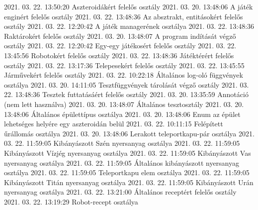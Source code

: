  {2021. 03. 22. 13:50:20} {Aszteroidákért felelős osztály}
 {2021. 03. 20. 13:48:06} {A játék enginért felelős osztály}
 {2021. 03. 22. 13:48:36} {Az absztrakt, entitásokért felelős osztály}
 {2021. 03. 22. 12:20:42} {A játék managerének osztálya}
 {2021. 03. 22. 13:48:36} {Raktárokért felelős osztály}
 {2021. 03. 20. 13:48:07} {A program indítását végző osztály}
 {2021. 03. 22. 12:20:42} {Egy-egy játékosért felelős osztály}
 {2021. 03. 22. 13:45:56} {Robotokért felelős osztály}
 {2021. 03. 22. 13:48:36} {Játéktérért felelős osztály}
 {2021. 03. 22. 13:17:36} {Telepesekért felelős osztály}
 {2021. 03. 22. 13:45:55} {Járművekért felelős osztály}
 {2021. 03. 22. 10:22:18} {Általános log-oló függvények osztálya}
 {2021. 03. 20. 14:11:05} {Tesztfüggvények tárolását végző osztály}
 {2021. 03. 22. 13:48:36} {Tesztek futtatásáért felelős osztály}
 {2021. 03. 20. 13:35:59} {Annotáció (nem lett használva) }
 {2021. 03. 20. 13:48:07} {Általános tesztosztály}
 {2021. 03. 20. 13:48:06} {Általános épülettípus osztálya}
 {2021. 03. 20. 13:48:06} {Enum az épület lehetséges helyére egy aszteroidán belül}
 {2021. 03. 22. 10:11:15} {Felépített űrállomás osztálya}
 {2021. 03. 20. 13:48:06} {Lerakott teleportkapu-pár osztálya}
 {2021. 03. 22. 11:59:05} {Kibányászott Szén nyersanyag osztálya}
 {2021. 03. 22. 11:59:05} {Kibányászott Vízjég nyersanyag osztálya}
 {2021. 03. 22. 11:59:05} {Kibányászott Vas nyersanyag osztálya}
 {2021. 03. 22. 11:59:05} {Általános kibányászott nyersanyag osztálya}
 {2021. 03. 22. 11:59:05} {Teleportkapu elem osztálya}
 {2021. 03. 22. 11:59:05} {Kibányászott Titán nyersanyag osztálya}
 {2021. 03. 22. 11:59:05} {Kibányászott Urán nyersanyag osztálya}
 {2021. 03. 22. 13:21:00} {Általános receptért felelős osztály}
 {2021. 03. 22. 13:19:29} {Robot-recept osztálya}
